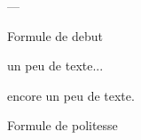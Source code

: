 \documentclass[11pt,a4paper]{letter}
\author{\auteur }
\title{\titre }
\begin{document}
\setcounter{page}{0}
\thispagestyle{empty}
\clearpage

\begin{letter}{---}

\opening{Formule de debut}

un peu de texte...

encore un peu de texte. 

\closing{Formule de politesse}

\end{letter}
\end{document}
